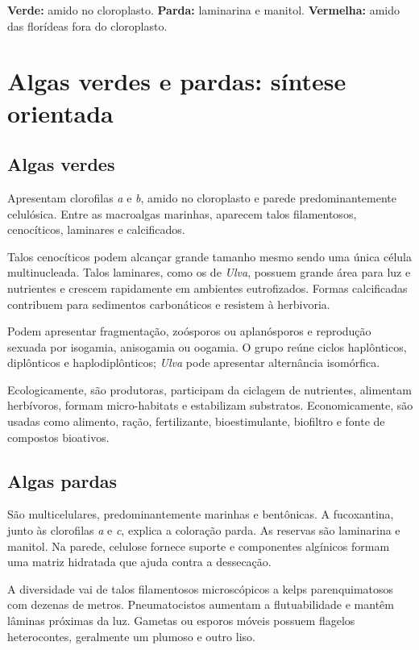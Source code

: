 \documentclass[12pt,a4paper]{article}
\begin{document}
\begin{essencial}
\textbf{Verde:} amido no cloroplasto. \textbf{Parda:} laminarina e manitol.
\textbf{Vermelha:} amido das florídeas fora do cloroplasto.
\end{essencial}

\section{Algas verdes e pardas: síntese orientada}

\subsection{Algas verdes}
Apresentam clorofilas \textit{a} e \textit{b}, amido no cloroplasto e parede
predominantemente celulósica. Entre as macroalgas marinhas, aparecem talos
filamentosos, cenocíticos, laminares e calcificados.

Talos cenocíticos podem alcançar grande tamanho mesmo sendo uma única célula
multinucleada. Talos laminares, como os de \textit{Ulva}, possuem grande área
para luz e nutrientes e crescem rapidamente em ambientes eutrofizados. Formas
calcificadas contribuem para sedimentos carbonáticos e resistem à herbivoria.

Podem apresentar fragmentação, zoósporos ou aplanósporos e reprodução sexuada
por isogamia, anisogamia ou oogamia. O grupo reúne ciclos haplônticos,
diplônticos e haplodiplônticos; \textit{Ulva} pode apresentar alternância
isomórfica.

Ecologicamente, são produtoras, participam da ciclagem de nutrientes, alimentam
herbívoros, formam micro-habitats e estabilizam substratos. Economicamente, são
usadas como alimento, ração, fertilizante, bioestimulante, biofiltro e fonte de
compostos bioativos.

\subsection{Algas pardas}
São multicelulares, predominantemente marinhas e bentônicas. A fucoxantina,
junto às clorofilas \textit{a} e \textit{c}, explica a coloração parda. As
reservas são laminarina e manitol. Na parede, celulose fornece suporte e
componentes algínicos formam uma matriz hidratada que ajuda contra a dessecação.

A diversidade vai de talos filamentosos microscópicos a kelps parenquimatosos
com dezenas de metros. Pneumatocistos aumentam a flutuabilidade e mantêm lâminas
próximas da luz. Gametas ou esporos móveis possuem flagelos heterocontes,
geralmente um plumoso e outro liso.
\end{document}
